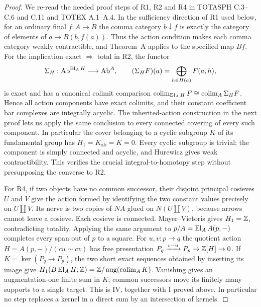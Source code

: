\begin{proof}
We re-read the needed proof steps of R1, R2 and R4 in TOTASPH
C.3--C.6 and C.11 and TOTEX A.1--A.4. In the sufficiency direction
of R1 used below, for an ordinary final $f:A\to B$ the comma
category $b\downarrow f$ is exactly the category of elements of
$a\mapsto B(b,f(a))$. Thus the action condition makes each comma
category weakly contractible, and Theorem~A applies to the specified
map $Bf$. For the implication exact $\Rightarrow$ total in R2,
the functor
\[
 \Sigma_H:\mathrm{Ab}^{\operatorname{El}_AH}\longrightarrow\mathrm{Ab}^A,
 \qquad (\Sigma_H F)(a)=\bigoplus_{h\in H(a)}F(a,h),
\]
is exact and has a canonical colimit comparison
$\operatorname*{colim}_{\operatorname{El}_AH}F\cong\operatorname*{colim}_A\Sigma_H F$. Hence all action
components have exact colimits, and their constant coefficient bar
complexes are integrally acyclic. The inherited-action construction
in the next proof lets us apply the same conclusion to every
connected covering of every such component. In particular the
cover belonging to a cyclic subgroup $K$ of its fundamental group
has $H_1=K_{\mathrm{ab}}=K=0$. Every cyclic subgroup is trivial;
the component is simply connected and acyclic, and Hurewicz gives
weak contractibility. This verifies the crucial integral-to-homotopy
step without presupposing the converse to R2.

For R4, if two objects have no common successor, their disjoint
principal cosieves $U$ and $V$ give the action formed by identifying
the two constant values precisely on $U\amalg V$. Its nerve is
two copies of $NA$ glued on $N(U\amalg V)$, because arrows cannot
leave a cosieve. Each cosieve is connected. Mayer--Vietoris gives
$H_1=\mathbb Z$, contradicting totality. Applying the same argument to
$p/A=\operatorname{El}_A A(p,-)$ completes every span out of $p$ to a square.
For $u,v:p\to q$ the quotient action
$H=A(p,-)/(cu\sim cv)$ has free presentation
$P_q\xrightarrow{v-u}P_p\to\mathbb Z[H]\to0$. If
$K=\ker(P_q\to P_p)$, the two short exact sequences obtained by
inserting its image give
$H_1(B\operatorname{El}_AH;\mathbb Z)=\mathbb Z/\operatorname{aug}(\operatorname*{colim}_A K)$. Vanishing gives an
augmentation-one finite sum in $K$; common successors move its
finitely many supports to a single target. This is IV, together
with I proved above. In particular no step replaces a kernel in a
direct sum by an intersection of kernels.
\end{proof}

